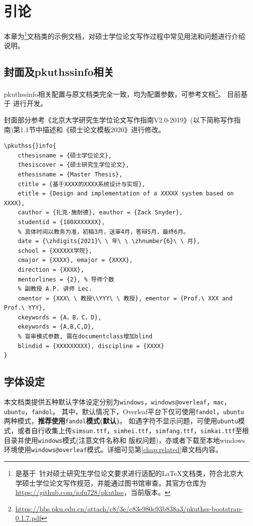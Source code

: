 \chapter{引论}
\label{chap:introduction}

本章为\iofupkuthss{}\footnote{\iofupkuthss{} 是基于\pkuthss{}~\cite{casper2011pkuthss}针对硕士研究生学位论文要求进行适配的\LaTeX{}文档类，符合北京大学硕士学位论文写作规范，并能通过图书馆审查。其官方仓库为\url{https://github.com/iofu728/pkuthss}，当前版本\iofuversion。}文档类的示例文档，对硕士学位论文写作过程中常见用法和问题进行介绍说明。

\section{封面及pkuthssinfo相关}
\label{sec:cover-pkuthssinfo}

pkuthssinfo相关配置与\pkuthss{}原文档类完全一致，均为配置参数，可参考\pkuthss{}文档\footnote{\url{https://bbs.pku.edu.cn/attach/c8/3e/c83e980c93b838a3/pkuthss-bootstrap-0.1.7.pdf}}。
目前\iofupkuthss{}基于\pkuthss{} \iofubaseversion{}进行开发。

封面部分参考《北京大学研究生学位论文写作指南V2.0-2019》(以下简称写作指南)第1.1节中描述和《硕士论文模板2020》进行修改。

\begin{Verbatim}
\pkuthss{}info{
	cthesisname = {硕士学位论文},
 	thesiscover = {硕士研究生学位论文},
	ethesisname = {Master Thesis},
	ctitle = {基于XXXX的XXXX系统设计与实现},
	etitle = {Design and implementation of a XXXXX system based on XXXX},
	cauthor = {扎克·施耐德}, eauthor = {Zack Snyder},
	studentid = {180XXXXXXX},
	% 具体时间以教务为准，初稿3月，送审4月，答辩5月，最终6月。
	date = {\zhdigits{2021}\ \ 年\ \ \zhnumber{6}\ \ 月},
	school = {XXXXXX学院},
	cmajor = {XXXX}, emajor = {XXXX},
	direction = {XXXX},
	mentorlines = {2}, % 导师个数
	% 副教授 A.P. 讲师 Lec.
	cmentor = {XXX\ \ 教授\\YYY\ \ 教授}, ementor = {Prof.\ XXX and Prof.\ YYY},
	ckeywords = {A，B，C，D},
	ekeywords = {A,B,C,D},
	% 盲审模式参数, 需在documentclass增加blind
	blindid = {XXXXXXXXX}, discipline = {XXXX}
}
\end{Verbatim}

\section{字体设定}
\label{sec:fontset}

本文档类提供五种默认字体设定分别为\verb|windows|，\verb|windows@overleaf|，\verb|mac|，\verb|ubuntu|，\verb|fandol|。
其中，默认情况下，Overleaf平台下仅可使用\verb|fandol|，\verb|ubuntu|两种模式，\textbf{推荐使用}\verb|fandol|\textbf{模式(默认)}。
如遇字符不显示问题，可使用\verb|ubuntu|模式，或者自行收集上传\verb|simsun.ttf|，\verb|simhei.ttf|，\verb|simfang.ttf|，\verb|simkai.ttf|至根目录并使用\verb|windows|模式(注意文件名称和 版权问题)，亦或者下载至本地windows环境使用\verb|windows@overleaf|模式。详细可见第\ref{chap:related}章文档内容。

